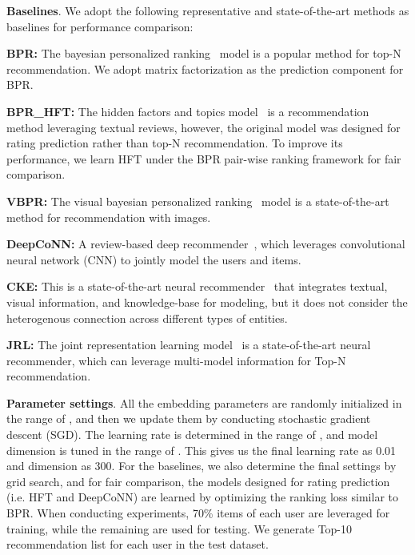 \documentclass[algorithms,article,accept,moreauthors,pdftex,10pt,a4paper]{Definitions/mdpi}
\begin{document}
\noindent
\textbf{Baselines}. We adopt the following representative and state-of-the-art methods as baselines for performance comparison:


 \textbf{BPR: } The bayesian personalized ranking~\cite{bpr} model is a popular method for top-N recommendation. We adopt matrix factorization as the prediction component for BPR.

 \textbf{BPR\_HFT: } The hidden factors and topics model~\cite{mcauley2013hidden} is a recommendation method leveraging textual reviews, however, the original model was designed for rating prediction rather than top-N recommendation. To improve its performance, we learn HFT under the BPR pair-wise ranking framework for fair comparison.

 \textbf{VBPR: } The visual bayesian personalized ranking~\cite{he2016vbpr} model is a state-of-the-art method for recommendation with images.

 \textbf{DeepCoNN: } A review-based deep recommender~\cite{zheng2017joint}, which leverages convolutional neural network (CNN) to jointly model the users and items.

 \textbf{CKE: } This is a state-of-the-art neural recommender~\cite{zhang2016collaborativekdd} that integrates textual, visual information, and knowledge-base for modeling, but it does not consider the heterogenous connection across different types of entities. 

 \textbf{JRL: } The joint representation learning model~\cite{zhang2017joint} is a state-of-the-art neural recommender, which can leverage multi-model information for Top-N recommendation. 








\noindent
\textbf{Parameter settings}. 
All the embedding parameters are randomly initialized in the range of , and then we update them by conducting stochastic gradient descent (SGD). 
The learning rate is determined in the range of , and model dimension is tuned in the range of . This gives us the final learning rate as 0.01 and dimension as 300.
For the baselines, we also determine the final settings by grid search, and for fair comparison, the models designed for rating prediction (i.e. HFT and DeepCoNN) are learned by optimizing the ranking loss similar to BPR. 
When conducting experiments, 70\% items of each user are leveraged for training, while the remaining are used for testing. We generate Top-10 recommendation list for each user in the test dataset.
\end{document}

